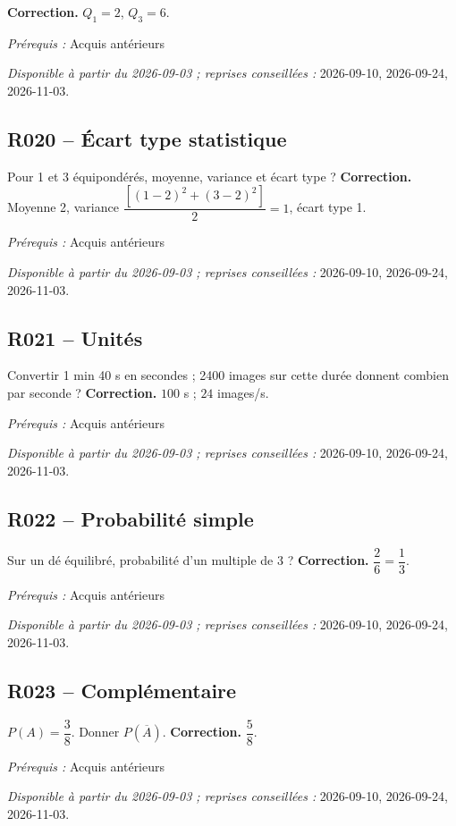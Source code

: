 \ifprof\textbf{Correction.} $Q_1=2$, $Q_3=6$.\par\textit{Prérequis :} Acquis antérieurs\par\textit{Disponible à partir du 2026-09-03 ; reprises conseillées :} 2026-09-10, 2026-09-24, 2026-11-03.\fi
{}\subsection*{R020 -- Écart type statistique}\label{R020}
Pour 1 et 3 équipondérés, moyenne, variance et écart type ?
\ifprof\textbf{Correction.} Moyenne 2, variance $\dfrac{[(1-2)^2+(3-2)^2]}{2}=1$, écart type 1.\par\textit{Prérequis :} Acquis antérieurs\par\textit{Disponible à partir du 2026-09-03 ; reprises conseillées :} 2026-09-10, 2026-09-24, 2026-11-03.\fi
{}\subsection*{R021 -- Unités}\label{R021}
Convertir 1 min 40 s en secondes ; 2400 images sur cette durée donnent combien par seconde ?
\ifprof\textbf{Correction.} $100$ s ; $24$ images/s.\par\textit{Prérequis :} Acquis antérieurs\par\textit{Disponible à partir du 2026-09-03 ; reprises conseillées :} 2026-09-10, 2026-09-24, 2026-11-03.\fi
{}\subsection*{R022 -- Probabilité simple}\label{R022}
Sur un dé équilibré, probabilité d’un multiple de 3 ?
\ifprof\textbf{Correction.} $\dfrac{2}{6}=\dfrac{1}{3}$.\par\textit{Prérequis :} Acquis antérieurs\par\textit{Disponible à partir du 2026-09-03 ; reprises conseillées :} 2026-09-10, 2026-09-24, 2026-11-03.\fi
{}\subsection*{R023 -- Complémentaire}\label{R023}
$P(A)=\dfrac{3}{8}$. Donner $P(\overline A)$.
\ifprof\textbf{Correction.} $\dfrac{5}{8}$.\par\textit{Prérequis :} Acquis antérieurs\par\textit{Disponible à partir du 2026-09-03 ; reprises conseillées :} 2026-09-10, 2026-09-24, 2026-11-03.\fi
